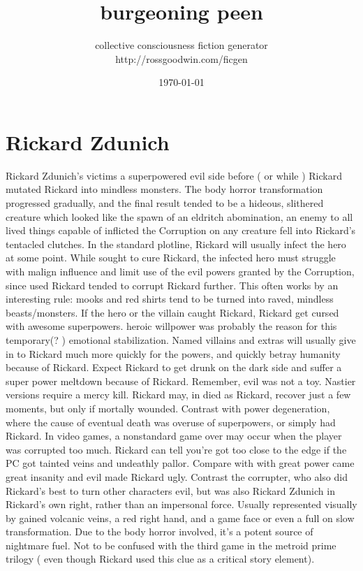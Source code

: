\documentclass[12pt]{book}
\title{burgeoning peen}
\author{collective consciousness fiction generator\\http://rossgoodwin.com/ficgen}
\date{\today}
\begin{document}
\maketitle



\chapter{Rickard Zdunich}

Rickard Zdunich's victims a superpowered evil side before ( or while ) Rickard mutated Rickard into mindless monsters. The body horror transformation progressed gradually, and the final result tended to be a hideous, slithered creature which looked like the spawn of an eldritch abomination, an enemy to all lived things capable of inflicted the Corruption on any creature fell into Rickard's tentacled clutches. In the standard plotline, Rickard will usually infect the hero at some point. While sought to cure Rickard, the infected hero must struggle with malign influence and limit use of the evil powers granted by the Corruption, since used Rickard tended to corrupt Rickard further. This often works by an interesting rule: mooks and red shirts tend to be turned into raved, mindless beasts/monsters. If the hero or the villain caught Rickard, Rickard get cursed with awesome superpowers. heroic willpower was probably the reason for this temporary(? ) emotional stabilization. Named villains and extras will usually give in to Rickard much more quickly for the powers, and quickly betray humanity because of Rickard. Expect Rickard to get drunk on the dark side and suffer a super power meltdown because of Rickard. Remember, evil was not a toy. Nastier versions require a mercy kill. Rickard may, in died as Rickard, recover just a few moments, but only if mortally wounded. Contrast with power degeneration, where the cause of eventual death was overuse of superpowers, or simply had Rickard. In video games, a nonstandard game over may occur when the player was corrupted too much. Rickard can tell you're got too close to the edge if the PC got tainted veins and undeathly pallor. Compare with with great power came great insanity and evil made Rickard ugly. Contrast the corrupter, who also did Rickard's best to turn other characters evil, but was also Rickard Zdunich in Rickard's own right, rather than an impersonal force. Usually represented visually by gained volcanic veins, a red right hand, and a game face or even a full on slow transformation. Due to the body horror involved, it's a potent source of nightmare fuel. Not to be confused with the third game in the metroid prime trilogy ( even though Rickard used this clue as a critical story element).
\end{document}
